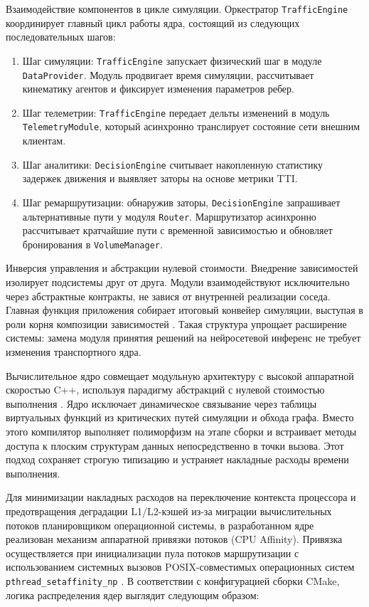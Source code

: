 Взаимодействие компонентов в цикле симуляции.
Оркестратор \texttt{TrafficEngine} координирует главный цикл работы ядра, состоящий из следующих последовательных шагов:
\begin{enumerate}
    \item Шаг симуляции: \texttt{TrafficEngine} запускает физический шаг в модуле \texttt{DataProvider}. Модуль продвигает время симуляции, рассчитывает кинематику агентов и фиксирует изменения параметров ребер.
    \item Шаг телеметрии: \texttt{TrafficEngine} передает дельты изменений в модуль \texttt{TelemetryModule}, который асинхронно транслирует состояние сети внешним клиентам.
    \item Шаг аналитики: \texttt{DecisionEngine} считывает накопленную статистику задержек движения и выявляет заторы на основе метрики TTI.
    \item Шаг ремаршрутизации: обнаружив заторы, \texttt{DecisionEngine} запрашивает альтернативные пути у модуля \texttt{Router}. Маршрутизатор асинхронно рассчитывает кратчайшие пути с временной зависимостью и обновляет бронирования в \texttt{VolumeManager}.
\end{enumerate}

Инверсия управления и абстракции нулевой стоимости.
Внедрение зависимостей изолирует подсистемы друг от друга. Модули взаимодействуют исключительно через абстрактные контракты, не завися от внутренней реализации соседа. Главная функция приложения собирает итоговый конвейер симуляции, выступая в роли корня композиции зависимостей \cite{butorin2026thread}. Такая структура упрощает расширение системы: замена модуля принятия решений на нейросетевой инференс не требует изменения транспортного ядра.

Вычислительное ядро совмещает модульную архитектуру с высокой аппаратной скоростью C++, используя парадигму абстракций с нулевой стоимостью выполнения \cite{fog_optimizing_cpp}. Ядро исключает динамическое связывание через таблицы виртуальных функций из критических путей симуляции и обхода графа. Вместо этого компилятор выполняет полиморфизм на этапе сборки и встраивает методы доступа к плоским структурам данных непосредственно в точки вызова. Этот подход сохраняет строгую типизацию и устраняет накладные расходы времени выполнения.

Для минимизации накладных расходов на переключение контекста процессора и предотвращения деградации L1/L2-кэшей из-за миграции вычислительных потоков планировщиком операционной системы, в разработанном ядре реализован механизм аппаратной привязки потоков (CPU Affinity). Привязка осуществляется при инициализации пула потоков маршрутизации с использованием системных вызовов POSIX-совместимых операционных систем \texttt{pthread\_setaffinity\_np} \cite{iso_iec_14882_2020}. В соответствии с конфигурацией сборки CMake, логика распределения ядер выглядит следующим образом:

